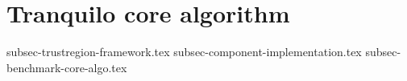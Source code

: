 \section{Tranquilo core algorithm}
{subsec-trustregion-framework.tex}
{subsec-component-implementation.tex}
{subsec-benchmark-core-algo.tex}
